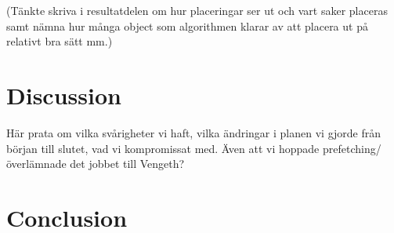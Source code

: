 \documentclass[9pt,a4paper]{acmproc}
\begin{document}
(Tänkte skriva i resultatdelen om hur placeringar ser ut och vart saker placeras samt nämna hur många object som algorithmen klarar av att placera ut på relativt bra sätt mm.)


\section{Discussion}
Här prata om vilka svårigheter vi haft, vilka ändringar i planen vi gjorde från början till slutet, vad vi kompromissat med. Även att vi hoppade prefetching/överlämnade det jobbet till Vengeth?

\section{Conclusion}

\end{document}
